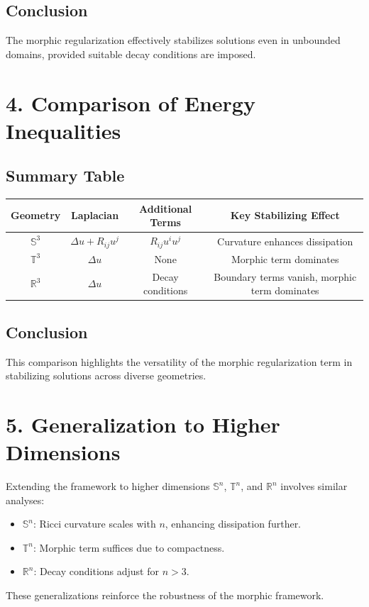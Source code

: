 \documentclass[12pt]{article}
\begin{document}
\subsection*{Conclusion}
The morphic regularization effectively stabilizes solutions even in unbounded domains, provided suitable decay conditions are imposed.

\section*{4. Comparison of Energy Inequalities}
\subsection*{Summary Table}
\begin{center}
\begin{tabular}{|c|c|c|c|}
\hline
Geometry & Laplacian & Additional Terms & Key Stabilizing Effect \\
\hline
\( \mathbb{S}^3 \) & \( \Delta u + R_{ij}u^j \) & \( R_{ij}u^i u^j \) & Curvature enhances dissipation \\
\hline
\( \mathbb{T}^3 \) & \( \Delta u \) & None & Morphic term dominates \\
\hline
\( \mathbb{R}^3 \) & \( \Delta u \) & Decay conditions & Boundary terms vanish, morphic term dominates \\
\hline
\end{tabular}
\end{center}

\subsection*{Conclusion}
This comparison highlights the versatility of the morphic regularization term in stabilizing solutions across diverse geometries.

\section*{5. Generalization to Higher Dimensions}
Extending the framework to higher dimensions \( \mathbb{S}^n \), \( \mathbb{T}^n \), and \( \mathbb{R}^n \) involves similar analyses:
\begin{itemize}
    \item \( \mathbb{S}^n \): Ricci curvature scales with \( n \), enhancing dissipation further.
    \item \( \mathbb{T}^n \): Morphic term suffices due to compactness.
    \item \( \mathbb{R}^n \): Decay conditions adjust for \( n > 3 \).
\end{itemize}

These generalizations reinforce the robustness of the morphic framework.
\end{document}
